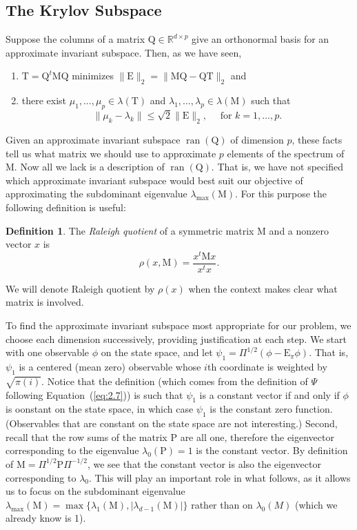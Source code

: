 \documentclass[12pt,letterpaper]{report}
\theoremstyle{plain}
\theoremstyle{definition}
\newtheorem{definition}[theorem]{Definition}
\theoremstyle{remark}
\numberwithin{theorem}{chapter}
\numberwithin{claim}{chapter}
\numberwithin{equation}{chapter}
\numberwithin{conjecture}{chapter}
\newcommand\R{\ensuremath{\mathbb{R}}}
\renewcommand\P{\ensuremath{\mathrm{P}}}
\newcommand\M{\ensuremath{\mathrm{M}}}
\newcommand\T{\ensuremath{\mathrm{T}}}
\newcommand\Q{\ensuremath{\mathrm{Q}}}
\newcommand\E{\ensuremath{\mathrm{E}}}
\newcommand\ran{\ensuremath{\operatorname{ran}}}
\newcommand\<{\ensuremath{\langle}}
\renewcommand\>{\ensuremath{\rangle}}
\begin{document}
\subsection{The Krylov Subspace}
\label{sec:krylov-subspace}
Suppose the columns of a matrix $\Q \in \R^{d\times p}$ give an orthonormal
basis for an approximate invariant subspace. Then, as we have seen, 
\begin{enumerate}
\item 
$\T = \Q^t\M\Q$ minimizes $\|\E\|_2 = \|\M\Q - \Q\T\|_2$ and
\item there exist $\mu_1, \dots, \mu_p\in \lambda(\T)$ and 
$\lambda_1,\dots, \lambda_p \in \lambda(\M)$ such that
\[
\|\mu_k-\lambda_k\| \leq \sqrt{2}\|\E\|_2, \quad \text{ for $k=1,\dots, p$.}
\]
\end{enumerate}
%
%
%
%
Given an approximate invariant subspace $\ran(\Q)$ of dimension $p$, these facts
tell us what matrix we should use to approximate $p$ elements of the spectrum of
$\M$. Now all we lack is a description of $\ran(\Q)$. 
That is, we have not specified which approximate invariant subspace would best
suit our objective of approximating the subdominant eigenvalue
$\lambda_{\max}(\M)$. For this purpose the following definition is useful:
\begin{definition}
The \emph{Raleigh quotient} of a symmetric matrix $\M$ and a nonzero vector $x$ is
\[
\rho(x, \M) = \frac{x^t\M x}{x^tx}.
\]
\end{definition}
We will denote Raleigh quotient by $\rho(x)$ when the context makes clear what
matrix is involved. 

To find the approximate invariant subspace most appropriate for our problem, we
choose each dimension successively, providing justification at each step. 
We start with one observable $\phi$ on the state space, and let 
$\psi_1 = \Pi^{1/2}(\phi -\E_\pi\phi)$. That is, $\psi_1$ is a centered (mean
zero) observable whose $i$th coordinate is weighted by $\sqrt{\pi(i)}$. 
Notice that the definition 
(which comes from the definition of $\Psi$ following Equation~(\ref{eq:2.7})) 
is such that $\psi_1$ is a constant vector if and only if $\phi$ is oonstant on the
state space, in which case $\psi_1$ is the constant zero function. 
(Observables that are constant on the state space are not interesting.) 
Second, recall that the row sums of the matrix $\P$ are all one, therefore the
eigenvector corresponding to the eigenvalue $\lambda_0(\P) = 1$ is the constant
vector.  By definition of $\M = \Pi^{1/2}\P\Pi^{-1/2}$, we see that the constant
vector is also the eigenvector corresponding to $\lambda_0$.  This will play an
important role in what follows, as it allows us to focus %
on the subdominant eigenvalue 
$\lambda_{\max}(\M) = \max\{\lambda_1(\M), |\lambda_{d-1}(\M)|\}$
rather than on $\lambda_0(M)$ (which we already know is 1).
\end{document}
